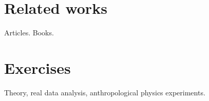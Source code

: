 \documentclass[%
 aip,
 jmp,%
 amsmath,amssymb,
 reprint,%
]{revtex4-1}
\begin{document}
\section{Related works}
Articles. Books.
\section{Exercises}
Theory, real data analysis, anthropological physics experiments.


\nocite{*}
\end{document}

